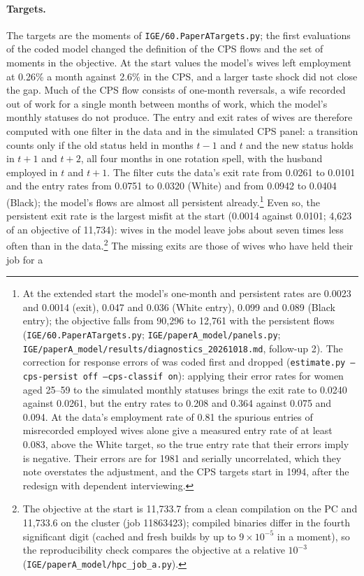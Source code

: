 \paragraph{Targets.} The targets are the moments of \texttt{IGE/60.PaperATargets.py}; the first evaluations of the
coded model changed the definition of the CPS flows and the set of moments in the objective. At the start values the model's wives left employment at 0.26\% a month against 2.6\% in the
CPS, and a larger taste shock did not close the gap. Much of the CPS flow consists of one-month reversals, a wife
recorded out of work for a single month between months of work, which the model's monthly statuses do not produce. The
entry and exit rates of wives are therefore computed with one filter in the data and in the simulated CPS panel: a
transition counts only if the old status held in months $t-1$ and $t$ and the new status holds in $t+1$ and $t+2$, all
four months in one rotation spell, with the husband employed in $t$ and $t+1$. The filter cuts the data's exit rate
from 0.0261 to 0.0101 and the entry rates from 0.0751 to 0.0320 (White) and from 0.0942 to 0.0404 (Black); the model's
flows are almost all persistent already.\footnote{At the extended start the model's one-month and persistent rates are
0.0023 and 0.0014 (exit), 0.047 and 0.036 (White entry), 0.099 and 0.089 (Black entry); the objective falls from 90{,}296
to 12{,}761 with the persistent flows (\texttt{IGE/60.PaperATargets.py}; \texttt{IGE/paperA\_model/panels.py};
\texttt{IGE/paperA\_model/results/diagnostics\_20261018.md}, follow-up 2). The correction for response errors of
\citet{poterba1986reporting} was coded first and dropped (\texttt{estimate.py --cps-persist off --cps-classif on}):
applying their error rates for women aged 25--59 to the simulated monthly statuses brings the exit rate to 0.0240
against 0.0261, but the entry rates to 0.208 and 0.364 against 0.075 and 0.094. At the data's employment rate of
0.81 the spurious entries of misrecorded employed wives alone give a measured entry rate of at least 0.083, above the
White target, so the true entry rate that their errors imply is negative. Their errors are for 1981 and serially
uncorrelated, which they note overstates the adjustment, and the CPS targets start in 1994, after the redesign with
dependent interviewing.} Even so, the persistent exit rate is the largest misfit at the start (0.0014 against 0.0101;
4{,}623 of an objective of 11{,}734): wives in the model leave jobs about seven times less often than in the
data.\footnote{The objective at the start is 11{,}733.7 from a clean compilation on the PC and 11{,}733.6 on the
cluster (job 11863423); compiled binaries differ in the fourth significant digit (cached and fresh builds by up to
$9\times10^{-5}$ in a moment), so the reproducibility check compares the objective at a relative $10^{-3}$
(\texttt{IGE/paperA\_model/hpc\_job\_a.py}).} The missing exits are those of wives who have held their job for a
